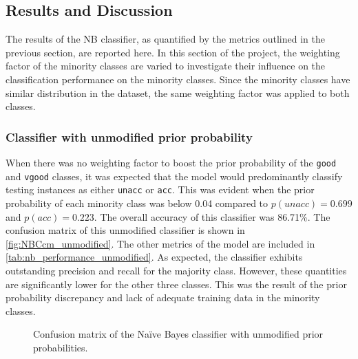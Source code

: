 \documentclass[a4paper]{article}
\begin{document}
\subsection{Results and Discussion}
The results of the NB classifier, as quantified by the metrics outlined in the previous section, are reported here. In this section of the project, the weighting factor of the minority classes are varied to investigate their influence on the classification performance on the minority classes. Since the minority classes have similar distribution in the dataset, the same weighting factor was applied to both classes.

\subsubsection{Classifier with unmodified prior probability}
When there was no weighting factor to boost the prior probability of the \lstinline{good} and \lstinline{vgood} classes, it was expected that the model would predominantly classify testing instances as either \lstinline{unacc} or \lstinline{acc}. This was evident when the prior probability of each minority class was below 0.04 compared to $p(unacc)=0.699$ and $p(acc)=0.223$. The overall accuracy of this classifier was 86.71\%. The confusion matrix of this unmodified classifier is shown in \autoref{fig:NBCcm_unmodified}. The other metrics of the model are included in \autoref{tab:nb_performance_unmodified}. As expected, the classifier exhibits outstanding precision and recall for the majority class. However, these quantities are significantly lower for the other three classes. This was the result of the prior probability discrepancy and lack of adequate training data in the minority classes.

\begin{figure} [h!]
  \caption{Confusion matrix of the Naïve Bayes classifier with unmodified prior probabilities.} 
  \label{fig:NBCcm_unmodified}
\end{figure}
\end{document}
